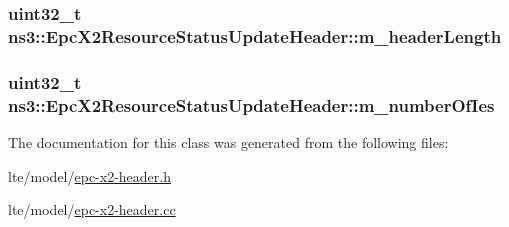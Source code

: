 \subsubsection[{\texorpdfstring{m\+\_\+header\+Length}{m_headerLength}}]{\setlength{\rightskip}{0pt plus 5cm}uint32\+\_\+t ns3\+::\+Epc\+X2\+Resource\+Status\+Update\+Header\+::m\+\_\+header\+Length\hspace{0.3cm}{\ttfamily [private]}}\hypertarget{classns3_1_1EpcX2ResourceStatusUpdateHeader_a318694daebc0b9a5f28656dc3a4ebbaa}{}\label{classns3_1_1EpcX2ResourceStatusUpdateHeader_a318694daebc0b9a5f28656dc3a4ebbaa}
\subsubsection[{\texorpdfstring{m\+\_\+number\+Of\+Ies}{m_numberOfIes}}]{\setlength{\rightskip}{0pt plus 5cm}uint32\+\_\+t ns3\+::\+Epc\+X2\+Resource\+Status\+Update\+Header\+::m\+\_\+number\+Of\+Ies\hspace{0.3cm}{\ttfamily [private]}}\hypertarget{classns3_1_1EpcX2ResourceStatusUpdateHeader_ad8852947ec96b2ba25dcfc976d287e1d}{}\label{classns3_1_1EpcX2ResourceStatusUpdateHeader_ad8852947ec96b2ba25dcfc976d287e1d}


The documentation for this class was generated from the following files\+:\begin{DoxyCompactItemize}
\item 
lte/model/\hyperlink{epc-x2-header_8h}{epc-\/x2-\/header.\+h}\item 
lte/model/\hyperlink{epc-x2-header_8cc}{epc-\/x2-\/header.\+cc}\end{DoxyCompactItemize}
